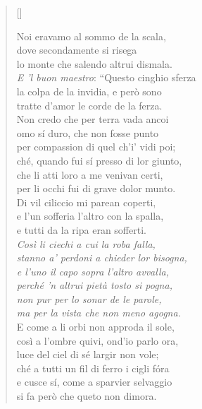 \documentclass{article}
\begin{document}
\begin{verse}[\versewidth]
  \begin{patverse*}
    Noi eravamo al sommo de la scala,\\
    dove secondamente si risega\\
    lo monte che salendo altrui dismala.\\
    \emph{E 'l buon maestro}: ``Questo cinghio sferza\\
    la colpa de la invidia, e però sono\\
    tratte d'amor le corde de la ferza.\\
    Non credo che per terra vada ancoi\\
    omo sí duro, che non fosse punto\\
    per compassion di quel ch'i' vidi poi;\\
    ché, quando fui sí presso di lor giunto,\\
    che li atti loro a me venivan certi,\\
    per li occhi fui di grave dolor munto.\\
    Di vil ciliccio mi parean coperti,\\
    e l'un sofferia l'altro con la spalla,\\
    e tutti da la ripa eran sofferti.\\
    \emph{Così li ciechi a cui la roba falla,\\
    stanno a' perdoni a chieder lor bisogna,\\
    e l'uno il capo sopra l'altro avvalla,\\
    perché 'n altrui pietà tosto si pogna,\\
    non pur per lo sonar de le parole,\\
    ma per la vista che non meno agogna.}\\
    E come a li orbi non approda il sole,\\
    così a l'ombre quivi, ond'io parlo ora,\\
    luce del ciel di sé largir non vole;\\
    ché a tutti un fil di ferro i cigli fóra\\
    e cusce sí, come a sparvier selvaggio\\
    si fa però che queto non dimora.
  \end{patverse*}
\end{verse}
\end{document}
